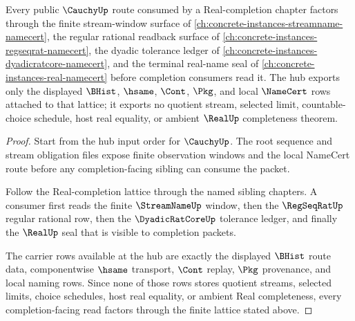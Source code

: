 \begin{theorem}
\label{thm:cauchy-hub-real-completion-lattice-route}
Every public $\CauchyUp$ route consumed by a Real-completion chapter factors through the finite stream-window surface of \autoref{ch:concrete-instances-streamname-namecert}, the regular rational readback surface of \autoref{ch:concrete-instances-regseqrat-namecert}, the dyadic tolerance ledger of \autoref{ch:concrete-instances-dyadicratcore-namecert}, and the terminal real-name seal of \autoref{ch:concrete-instances-real-namecert} before completion consumers read it. The hub exports only the displayed $\BHist$, $\hsame$, $\Cont$, $\Pkg$, and local $\NameCert$ rows attached to that lattice; it exports no quotient stream, selected limit, countable-choice schedule, host real equality, or ambient $\RealUp$ completeness theorem.
\end{theorem}
\begin{proof}
Start from the hub input order for $\CauchyUp$. The root sequence and stream obligation files expose finite observation windows and the local NameCert route before any completion-facing sibling can consume the packet.

Follow the Real-completion lattice through the named sibling chapters. A consumer first reads the finite $\StreamNameUp$ window, then the $\RegSeqRatUp$ regular rational row, then the $\DyadicRatCoreUp$ tolerance ledger, and finally the $\RealUp$ seal that is visible to completion packets.

The carrier rows available at the hub are exactly the displayed $\BHist$ route data, componentwise $\hsame$ transport, $\Cont$ replay, $\Pkg$ provenance, and local naming rows. Since none of those rows stores quotient streams, selected limits, choice schedules, host real equality, or ambient Real completeness, every completion-facing read factors through the finite lattice stated above.
\end{proof}
